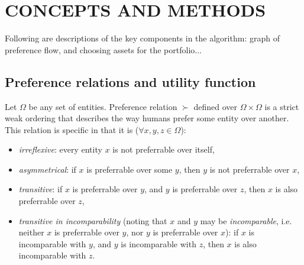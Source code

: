 \documentclass[letterpaper, 10 pt, conference]{ieeeconf}
\begin{document}
  
  
  
  \section{CONCEPTS AND METHODS}
  
  Following are descriptions of the key components in the algorithm: graph of preference flow, and choosing assets for the portfolio...
  
  \subsection{Preference relations and utility function}
  
  Let $\Omega$ be any set of entities.
  Preference relation $\succ$ defined over $\Omega \times \Omega$ is a strict weak ordering that describes the way humans prefer some entity over another.
  This relation is specific in that it is ($\forall x, y, z \in \Omega$):
  \begin{itemize}
    \item \textit{irreflexive}: every entity $x$ is not preferrable over itself, %
    \item \textit{asymmetrical}: if $x$ is preferrable over some $y$, then $y$ is not preferrable over $x$, %
    \item \textit{transitive}: if $x$ is preferrable over $y$, and $y$ is preferrable over $z$, then $x$ is also preferrable over $z$, %
    \item \textit{transitive in incomparability} (noting that $x$ and $y$ may be \textit{incomparable}, i.e. neither $x$ is preferrable over $y$, nor $y$ is preferrable over $x$): if $x$ is incomparable with $y$, and $y$ is incomparable with $z$, then $x$ is also incomparable with $z$.
  \end{itemize}
\end{document}
